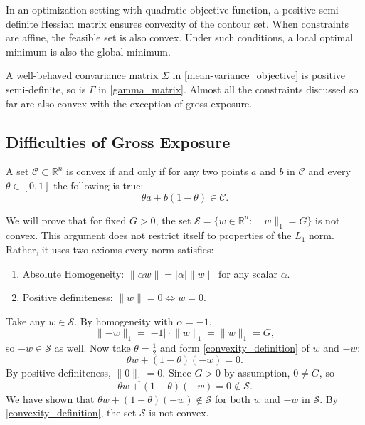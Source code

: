 \documentclass[11pt, letterpaper]{article}
\begin{document}
In an optimization setting with quadratic objective function, a positive semi-definite Hessian matrix ensures convexity of the
contour set. When constraints are affine, the feasible set is also convex. Under such conditions, a local optimal minimum is
also the global minimum.

A well-behaved convariance matrix $\Sigma$ in \eqref{mean-variance_objective} is positive semi-definite, so is $\Gamma$ in
\eqref{gamma_matrix}. Almost all the constraints discussed so far are also convex with the exception of gross exposure.

\subsection{Difficulties of Gross Exposure}
\label{gross_exposure_section}
A set $\mathcal{C} \subset \mathds{R}^n$ is convex if and only if for any two points $a$ and $b$ in $\mathcal{C}$ and every
$\theta \in [0,1]$ the following is true:
\begin{equation}
    \label{convexity_definition}
	\theta a + b (1 - \theta) \in \mathcal{C}.
\end{equation}

We will prove that for fixed $G > 0$, the set $\mathcal{S} = \{w\in \mathds{R}^n:\lVert w\rVert_1 = G\}$ is not convex.
This argument does not restrict itself to properties of the $L_1$ norm. Rather, it uses two axioms every norm satisfies:
\begin{enumerate}
	\item Absolute Homogeneity: $\lVert\alpha w\rVert = |\alpha| \lVert w\rVert$ for any scalar $\alpha$.
	\item Positive definiteness: $\lVert w\rVert = 0 \Leftrightarrow w = 0$.
\end{enumerate}
Take any $w \in \mathcal{S}$. By homogeneity with $\alpha = -1$,
\begin{equation*}
	\lVert-w\rVert_1 = | -1|\cdot \lVert w\rVert_1 = \lVert w\rVert_1 = G,
\end{equation*}
so $-w \in \mathcal{S}$ as well. Now take $\theta = \frac{1}{2}$ and form \eqref{convexity_definition} of $w$ and $-w$:
\begin{equation*}
	\theta w + (1-\theta)(-w) = 0.
\end{equation*}
By positive definiteness, $\lVert 0\rVert_1 = 0$. Since $G>0$ by assumption, $0 \neq G$, so
\begin{equation*}
	\theta w + (1-\theta)(-w) = 0 \notin \mathcal{S}.
\end{equation*}
We have shown that $\theta w + (1 - \theta) (-w) \notin \mathcal{S}$ for both $w$ and $-w$ in $\mathcal{S}$.
By \eqref{convexity_definition}, the set $\mathcal{S}$ is not convex.
\end{document}

